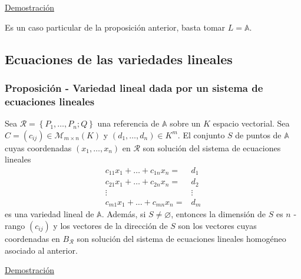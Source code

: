 \documentclass[12pt, a4paper, ones, notitlepage, openany,titlepage]{article}
\newcommand{\demostracion}{\noindent\underline{Demostración}}
\begin{document}
\demostracion

\noindent Es un caso particular de la proposición anterior, basta tomar $L=\mathbb{A}$.

\subsection{Ecuaciones de las variedades lineales}

\subsubsection{Proposición - Variedad lineal dada por un sistema de ecuaciones lineales}
Sea $\mathcal{R}=\left\{P_{1}, \ldots, P_{n} ; Q\right\}$ una referencia de $\mathbb{A}$ sobre un $K$ espacio vectorial. Sea $C = (c_{ij}) \in \mathcal{M}_{m \times n}(K)$ y $(d_1,\ldots,d_n) \in K^m$. El conjunto $S$ de puntos de $\mathbb{A}$ cuyas coordenadas $\left(x_{1}, \ldots, x_{n}\right)$ en $\mathcal{R}$ son solución del sistema de ecuaciones lineales
$$
\begin{aligned}
c_{11} x_{1}+\ldots+c_{1 n} x_{n}= & d_{1} \\
c_{21} x_{1}+\ldots+c_{2 n} x_{n}= & d_{2} \\
\vdots & \vdots \\
c_{m 1} x_{1}+\ldots+c_{m n} x_{n}= & d_{m}
\end{aligned}
$$
es una variedad lineal de $\mathbb{A}$. Además, si $S \neq \varnothing$, entonces la dimensión de $S$ es $n$ - rango $\left(c_{i j}\right)$ y los vectores de la dirección de $S$ son los vectores cuyas coordenadas en $B_{\mathcal{R}}$ son solución del sistema de ecuaciones lineales homogéneo asociado al anterior.

\demostracion
\end{document}
